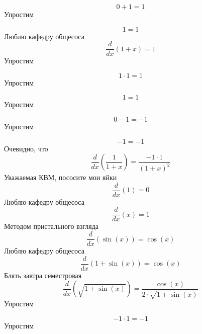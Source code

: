 \documentclass[12pt, a4paper]{article}
\begin{document}
\begin{equation}
0+1 = 1
\end{equation}
Упростим

\begin{equation}
1 = 1
\end{equation}
Люблю кафедру общесоса
\begin{equation}
\frac{d}{dx}(1+x) = 1
\end{equation}
Упростим

\begin{equation}
1 \cdot 1 = 1
\end{equation}
Упростим

\begin{equation}
1 = 1
\end{equation}
Упростим

\begin{equation}
0-1 = -1
\end{equation}
Упростим

\begin{equation}
-1 = -1
\end{equation}
Очевидно, что
\begin{equation}
\frac{d}{dx}(\frac{1}{1+x}) = \frac{-1 \cdot 1}{{(1+x)}^{2}}
\end{equation}
Уважаемая КВМ, пососите мои яйки
\begin{equation}
\frac{d}{dx}(1) = 0
\end{equation}
Люблю кафедру общесоса
\begin{equation}
\frac{d}{dx}(x) = 1
\end{equation}
Методом пристального взгляда
\begin{equation}
\frac{d}{dx}(\sin(x)) = \cos(x)
\end{equation}
Люблю кафедру общесоса
\begin{equation}
\frac{d}{dx}(1+\sin(x)) = \cos(x)
\end{equation}
Блять завтра семестровая
\begin{equation}
\frac{d}{dx}(\sqrt{1+\sin(x)}) = \frac{\cos(x)}{2 \cdot \sqrt{1+\sin(x)}}
\end{equation}
Упростим

\begin{equation}
-1 \cdot 1 = -1
\end{equation}
Упростим
\end{document}
